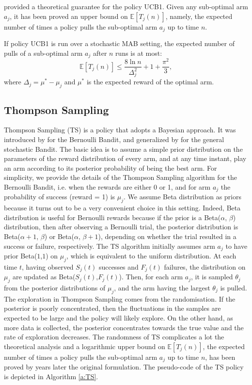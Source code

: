 \cite{auer2002finite} provided a theoretical guarantee for the policy UCB1. Given any sub-optimal arm $a_j$, it has been proved an upper bound on $\mathbb{E}[T_j(n)]$, namely, the expected number of times a policy pulls the sub-optimal arm $a_j$ up to time $n$.
\begin{theorem} If policy UCB1 is run over a stochastic MAB setting, the expected number of pulls of a sub-optimal arm $a_j$ after $n$ runs is at most:
	$$\mathbb{E}[T_j(n)] \leq \frac{8 \ln n}{\Delta_j^{2}} + 1 +\frac{\pi^{2}}{3} ,$$
where  $\Delta_j = \mu^{*}-\mu_j$ and $\mu^{*}$ is the expected reward of the optimal arm.
	
\end{theorem}




 
\subsection*{Thompson Sampling}
Thompson Sampling (TS) is a policy that adopts a Bayesian approach. It was introduced by \cite{thompson1933likelihood} for the Bernoulli Bandit, and generalized by \cite{agrawal2012analysis}  for the general stochastic Bandit. The basic idea is to assume a simple prior distribution on the parameters of the reward distribution of every arm, and at any time instant, play an arm according to its posterior probability of being the best arm. For simplicity, we provide the details of the Thompson Sampling algorithm for the Bernoulli Bandit, i.e. when the rewards are either 0 or 1, and for arm $a_j$ the probability of success (reward = 1) is $\mu_j$. We assume Beta distribution as priors because it turns out to be a very convenient choice in this setting. Indeed, Beta distribution is useful for Bernoulli rewards because if the prior is a Beta($\alpha$, $\beta$) distribution, then after observing a Bernoulli trial, the posterior distribution is Beta($\alpha +1$, $\beta$) or Beta($\alpha$, $\beta +1$), depending on whether the trial resulted in a success or failure, respectively. The TS algorithm initially assumes arm $a_j$ to have prior Beta($1$,$1$) on $\mu_j$, which is equivalent to the uniform distribution. At each time $t$, having observed $S_j(t)$ successes and $F_j(t)$ failures, the distribution on $\mu_j$ are updated as Beta($S_j(t)$,$F_j(t)$). Then, for each arm $a_j$, it is sampled $\theta_j$ from the posterior distributions of $\mu_j$, and the arm having the largest $\theta_j$ is pulled. The exploration in Thompson Sampling comes from the randomisation. If the posterior is poorly concentrated, then the fluctuations in the samples are expected to be large and the policy will likely explore. On the other hand, as more data is collected, the posterior concentrates towards the true value and the rate of exploration decreases. The randomness of TS complicates a lot the theoretical analysis and a logarithmic upper bound on $\mathbb{E}[T_j(n)]$, the expected number of times a policy pulls the sub-optimal arm $a_j$ up to time $n$, has been proved by \cite{agrawal2012analysis} years later the original formulation. The pseudo-code of the TS policy is depicted in Algorithm \ref{a:TS}.


